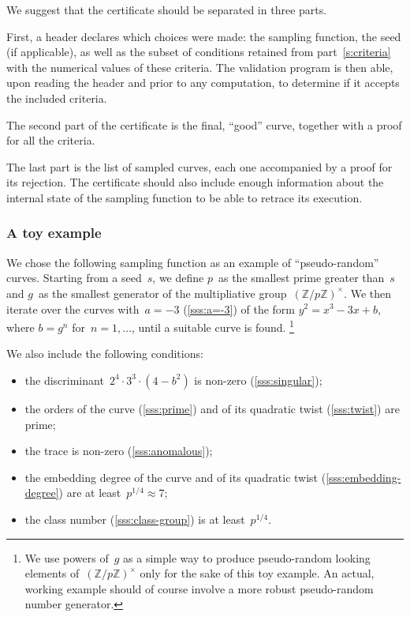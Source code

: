 \documentclass[twocolumn,letterpaper,10pt]{article}
\begin{document}
We suggest that the certificate should be separated in three parts.

First, a header declares which choices were made:
the sampling function, the seed (if applicable),
as well as the subset of conditions retained from part~\ref{s:criteria}
with the numerical values of these criteria.
The validation program is then able,
upon reading the header and prior to any computation,
to determine if it accepts the included criteria.

The second part of the certificate is the final, “good” curve,
together with a proof for all the criteria.

The last part is the list of sampled curves,
each one accompanied by a proof for its rejection.
The certificate should also include enough information about
the internal state of the sampling function
to be able to retrace its execution.

\subsubsection{A toy example}

We chose the following sampling function as an example
of “pseudo-random” curves.
Starting from a seed~$s$, we define $p$~as the smallest prime greater than~$s$
and $g$~as the smallest generator of the multipliative group~$(ℤ/pℤ)^{×}$.
We then iterate over the curves with~$a = -3$ (\ref{sss:a=-3})
of the form $y^2 = x^3 - 3 x + b$, where $b = g^n$ for~$n = 1, …$,
until a suitable curve is found.%
\footnote{We use powers of~$g$ as a simple way to produce pseudo-random
looking elements of~$(ℤ/pℤ)^{×}$ only for the sake of this toy example.
An actual, working example should of course involve a more robust
pseudo-random number generator.}

We also include the following conditions:
\begin{itemize} \itemsep 0pt \parskip 0pt
\item the discriminant~$2^4·3^3·(4-b^2)$ is non-zero
(\ref{sss:singular});
\item the orders of the curve (\ref{sss:prime}) and of its quadratic twist
(\ref{sss:twist}) are prime;
\item the trace is non-zero (\ref{sss:anomalous});
\item the embedding degree of the curve and of its quadratic twist
(\ref{sss:embedding-degree}) are at least~$p^{1/4} ≈ 7$;
\item the class number (\ref{sss:class-group}) is at least~$p^{1/4}$.
\end{itemize}
\end{document}
